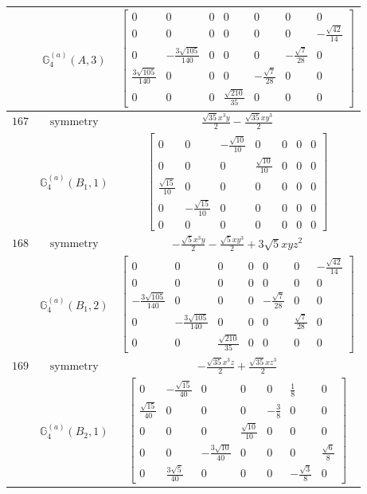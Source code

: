 \documentclass[fleqn,8pt,landscape]{jsarticle}
\begin{document}
\begin{longtable}{ccc}
$  $ & $ \mathbb{G}_{4}^{(a)}(A,3) $ & $ \begin{bmatrix} 0 & 0 & 0 & 0 & 0 & 0 & 0 \\ 0 & 0 & 0 & 0 & 0 & 0 & - \frac{\sqrt{42}}{14} \\ 0 & - \frac{3 \sqrt{105}}{140} & 0 & 0 & 0 & - \frac{\sqrt{7}}{28} & 0 \\ \frac{3 \sqrt{105}}{140} & 0 & 0 & 0 & - \frac{\sqrt{7}}{28} & 0 & 0 \\ 0 & 0 & 0 & \frac{\sqrt{210}}{35} & 0 & 0 & 0 \end{bmatrix} $ \\ \hline
$ 167 $ & $ \text{symmetry} $ & $ \frac{\sqrt{35} x^{3} y}{2} - \frac{\sqrt{35} x y^{3}}{2} $ \\
$  $ & $ \mathbb{G}_{4}^{(a)}(B_{1},1) $ & $ \begin{bmatrix} 0 & 0 & - \frac{\sqrt{10}}{10} & 0 & 0 & 0 & 0 \\ 0 & 0 & 0 & \frac{\sqrt{10}}{10} & 0 & 0 & 0 \\ \frac{\sqrt{15}}{10} & 0 & 0 & 0 & 0 & 0 & 0 \\ 0 & - \frac{\sqrt{15}}{10} & 0 & 0 & 0 & 0 & 0 \\ 0 & 0 & 0 & 0 & 0 & 0 & 0 \end{bmatrix} $ \\ \hline
$ 168 $ & $ \text{symmetry} $ & $ - \frac{\sqrt{5} x^{3} y}{2} - \frac{\sqrt{5} x y^{3}}{2} + 3 \sqrt{5} x y z^{2} $ \\
$  $ & $ \mathbb{G}_{4}^{(a)}(B_{1},2) $ & $ \begin{bmatrix} 0 & 0 & 0 & 0 & 0 & 0 & - \frac{\sqrt{42}}{14} \\ 0 & 0 & 0 & 0 & 0 & 0 & 0 \\ - \frac{3 \sqrt{105}}{140} & 0 & 0 & 0 & - \frac{\sqrt{7}}{28} & 0 & 0 \\ 0 & - \frac{3 \sqrt{105}}{140} & 0 & 0 & 0 & \frac{\sqrt{7}}{28} & 0 \\ 0 & 0 & \frac{\sqrt{210}}{35} & 0 & 0 & 0 & 0 \end{bmatrix} $ \\ \hline
$ 169 $ & $ \text{symmetry} $ & $ - \frac{\sqrt{35} x^{3} z}{2} + \frac{\sqrt{35} x z^{3}}{2} $ \\
$  $ & $ \mathbb{G}_{4}^{(a)}(B_{2},1) $ & $ \begin{bmatrix} 0 & - \frac{\sqrt{15}}{40} & 0 & 0 & 0 & \frac{1}{8} & 0 \\ \frac{\sqrt{15}}{40} & 0 & 0 & 0 & - \frac{3}{8} & 0 & 0 \\ 0 & 0 & 0 & \frac{\sqrt{10}}{10} & 0 & 0 & 0 \\ 0 & 0 & - \frac{3 \sqrt{10}}{40} & 0 & 0 & 0 & \frac{\sqrt{6}}{8} \\ 0 & \frac{3 \sqrt{5}}{40} & 0 & 0 & 0 & - \frac{\sqrt{3}}{8} & 0 \end{bmatrix} $ \\ \hline

\end{longtable}
\end{document}

